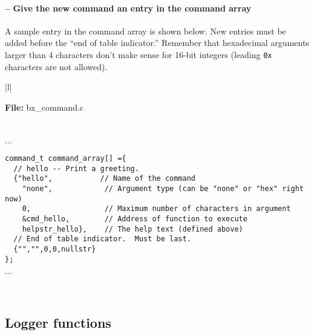 \addtocounter{comcount}{1}
\paragraph{ -- Give the new command an entry in the command array}
A sample entry in the command array is shown below.  New entries must
be added before the ``end of table indicator.'' Remember that
hexadecimal arguments larger than 4 characters don't make sense for
16-bit integers (leading \texttt{0x} characters are not allowed).

\begin{center}
  \vspace{-\baselineskip}
  \begin{tabular}{|l|} \hline
    \begin{minipage}[c]{\textwidth - 2\tabcolsep}
      \textbf{File:}
      bx\_command.c
    \end{minipage}\\
    \begin{minipage}[c]{\textwidth - 2\tabcolsep}
      \vspace{0.5\baselineskip}
      $\cdots$ \\
      \begin{minipage}[c]{\textwidth - 2\tabcolsep}
        \lstset{language=c}
        \begin{lstlisting}
command_t command_array[] ={
  // hello -- Print a greeting.
  {"hello",           // Name of the command
    "none",            // Argument type (can be "none" or "hex" right now)
    0,                 // Maximum number of characters in argument
    &cmd_hello,        // Address of function to execute
    helpstr_hello},    // The help text (defined above)  
  // End of table indicator.  Must be last.
  {"","",0,0,nullstr}
};      
\end{lstlisting}
      \end{minipage}
      $\cdots$\\
      \vspace{-0.5\baselineskip}
    \end{minipage}\\
    \hline
  \end{tabular}
\end{center}


\clearpage
\subsection{Logger functions}

